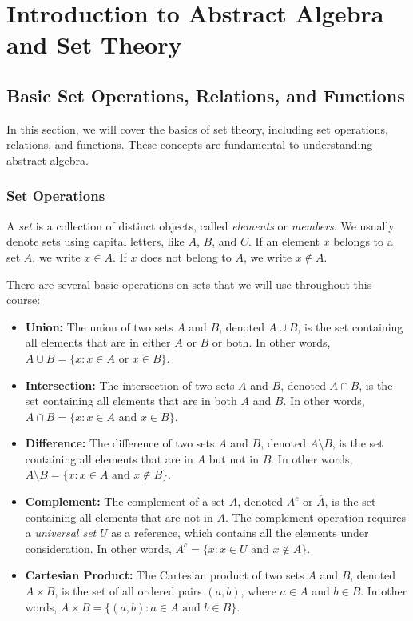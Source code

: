 
\chapter{Introduction to Abstract Algebra and Set Theory}

\section{Basic Set Operations, Relations, and Functions}

In this section, we will cover the basics of set theory, including set operations, relations, and functions. These concepts are fundamental to understanding abstract algebra.

\subsection{Set Operations}

A \textit{set} is a collection of distinct objects, called \textit{elements} or \textit{members}. We usually denote sets using capital letters, like $A$, $B$, and $C$. If an element $x$ belongs to a set $A$, we write $x \in A$. If $x$ does not belong to $A$, we write $x \notin A$.

There are several basic operations on sets that we will use throughout this course:

\begin{itemize} 

\item \textbf{Union:} The union of two sets $A$ and $B$, denoted $A \cup B$, is the set containing all elements that are in either $A$ or $B$ or both. In other words, $A \cup B = \{x:x \in A \text{ or } x \in B\}$. 

    \item \textbf{Intersection:} The intersection of two sets $A$ and $B$, denoted $A \cap B$, is the set containing all elements that are in both $A$ and $B$. In other words, $A \cap B = \{x:x \in A \text{ and } x \in B\}$.

    \item \textbf{Difference:} The difference of two sets $A$ and $B$, denoted $A \setminus B$, is the set containing all elements that are in $A$ but not in $B$. In other words, $A \setminus B = \{x:x \in A \text{ and } x \notin B \}$. 

    \item \textbf{Complement:} The complement of a set $A$, denoted $A^c$ or $\overline{A}$, is the set containing all elements that are not in $A$. The complement operation requires a \textit{universal set} $U$ as a reference, which contains all the elements under consideration. In other words, $A^c = \{x:x \in U \text{ and } x \notin A\}$.

    \item \textbf{Cartesian Product:} The Cartesian product of two sets $A$ and $B$, denoted $A \times B$, is the set of all ordered pairs $(a, b)$, where $a \in A$ and $b \in B$. In other words, $A \times B = \{(a,b):a \in A \text{ and } b \in B\}$. 

\end{itemize}

